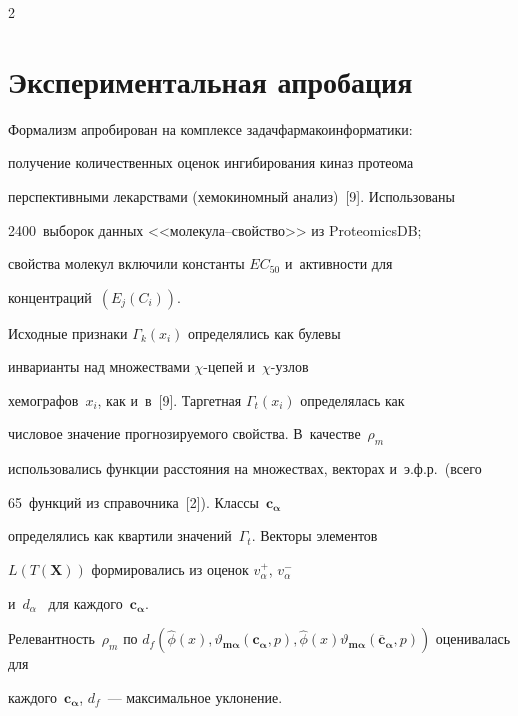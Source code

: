 \begin{multicols}{2}
\begin{table}
\begin{center}
\end{center}

\end{table}



\section{Экспериментальная апробация }



    Формализм апробирован на комплексе задач\linebreak фармакоинформатики: 

получение количественных оценок ингибирования киназ протеома 

перспективными лекарствами (хемокиномный анализ)~[9]. Использованы 

2400~выборок данных <<\mbox{мо\-ле\-ку\-ла}--свой\-ст\-во>> из ProteomicsDB; 

свойства молекул включили константы $EC_{50}$ и~активности для 

концентраций~$(E_j(C_i))$.



     Исходные признаки $\Gamma_k(x_i)$ определялись как булевы 

инварианты над множествами $\chi$-це\-пей и~$\chi$-уз\-лов 

хемографов~$x_i$, как и~в~[9]. Таргетная $\Gamma_t(x_i)$ определялась как 

числовое значение прогнозируемого свойства. В~качестве~$\rho_m$ 

использовались функции расстояния на множествах, векторах и~э.ф.р.\ (всего 

65~функций из справочника~[2]). Классы~$\mathbf{c}_{\bm{\alpha}}$ 

определялись как квартили значений~$\Gamma_t$. Векторы элементов 

$L(T(\mathbf{X}))$ формировались из оценок $v^+_\alpha$, $v^-_\alpha$ 

и~$d_\alpha$~\cite{4-tor} для каждого~$\mathbf{c}_{\bm{\alpha}}$. 

Релевантность~$\rho_m$ по $d_f(\hat{\phi}(x),\vartheta_{\mathbf{m}{\bm 

\alpha}}(\mathbf{c}_{\bm{\alpha}},{p}), 

\hat{\phi}(x)\vartheta_{\mathbf{m}{\bm \alpha}} 

(\overline{\mathbf{c}}_{\bm{\alpha}}, {p}))$ оценивалась для 

каждого~$\mathbf{c}_{\bm{\alpha}}$, $d_f$~--- максимальное уклонение. 


\end{multicols}
